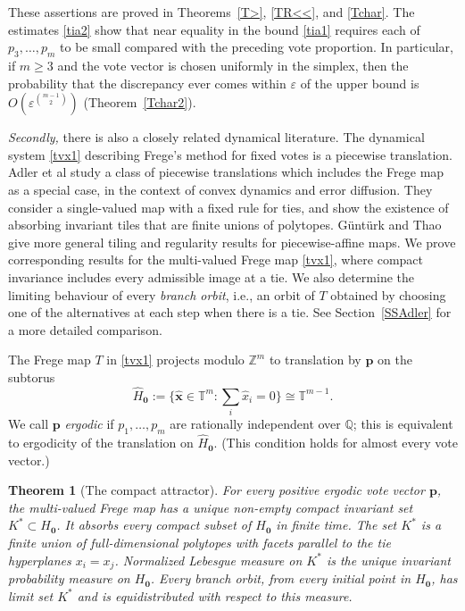 \documentclass[11pt,reqno,tbtags,a4paper]{amsart}
\numberwithin{equation}{section}
\renewcommand\ge{\geq}
\renewcommand\geq{\geqslant}
\theoremstyle{plain}%
\newtheorem{fregeintrotheorem}{Theorem}
\theoremstyle{definition}
\theoremstyle{remark}
\newcommand{\refT}[1]{Theorem~\ref{#1}}
\newcommand{\refSS}[1]{Section~\ref{#1}}
\newcommand\bbT{\mathbb T}
\newcommand\bbQ{\mathbb Q}
\newcommand\bbZ{\mathbb Z}
\newcommand\Ho{H_{\0}}
\newcommand\hHo{\hH_{\0}}
\newcommand\vp{\mathbf{p}}
\newcommand\vx{\mathbf{x}}
\newcommand\etal{{et al\xperiod}}
\newcommand\hH{\widehat{H}}
\newcommand\Kx{K^*}
\newcommand\0{{\boldsymbol 0}}
\newcommand\1{{\boldsymbol 1}}
\begin{document}
These assertions are proved in Theorems~\ref{T>}, \ref{TR<<}, and \ref{Tchar}.
The estimates \eqref{tia2} show that near equality in the bound \eqref{tia1}
requires each of $p_3,\dots,p_m$ to be small compared with the preceding
vote proportion. In particular, if $m\ge3$ and
the vote vector is chosen uniformly in the simplex, then
the probability that the discrepancy ever comes within $\varepsilon$ of the
upper bound is 
$O(\varepsilon^{\binom{m-1}{2}})$
(\refT{Tchar2}).

\medskip
\emph{Secondly,}
there is also a closely related dynamical literature.
The dynamical system \eqref{tvx1} describing Frege's method for fixed votes
is a piecewise translation.
Adler \etal{} \cite{adler0,adler10,adler17,adler18} study
a class of piecewise translations which includes the Frege map as a special
case, in the context of convex dynamics and error diffusion.
They consider a single-valued map with a fixed rule for ties,
and show the existence of absorbing invariant
tiles that are finite unions of polytopes.
G\"unt\"urk and Thao \cite{gun}
give more general tiling and regularity results for piecewise-affine maps.
We prove corresponding results for the multi-valued Frege map \eqref{tvx1},
where compact invariance includes every admissible image at a tie.
We also determine the limiting behaviour of every
\emph{branch orbit}, i.e., an orbit of $T$ obtained by choosing one of the
alternatives at each step when there is a tie.
See \refSS{SSAdler} for a more detailed comparison.

The Frege map $T$ in \eqref{tvx1} projects modulo $\bbZ^m$
to translation by $\vp$ on the subtorus
\begin{equation}
\hHo:=\bigl\{\widehat{\vx}\in\bbT^m:
\textstyle\sum_i\widehat x_i=0\bigr\}
\cong\bbT^{m-1}.
\end{equation}
We call $\vp$ \emph{ergodic} if
$p_1,\dots,p_m$ are rationally independent over $\bbQ$; this is equivalent
to ergodicity of the translation on $\hHo$.
(This condition holds for almost every vote vector.)

\begin{fregeintrotheorem}[The compact attractor]\label{TIntroB}
For every positive ergodic vote vector $\vp$, the multi-valued Frege map
has a unique non-empty compact invariant set $\Kx\subset\Ho$.
It absorbs every compact subset of $\Ho$ in finite time.
The set $\Kx$ is a finite union of full-dimensional polytopes with facets
parallel to the tie hyperplanes $x_i=x_j$.
Normalized Lebesgue measure on $\Kx$ is the unique invariant probability
measure on $\Ho$. Every branch orbit, from every initial point in $\Ho$,
has limit set $\Kx$ and is equidistributed with respect to this measure.
\end{fregeintrotheorem}
\end{document}
